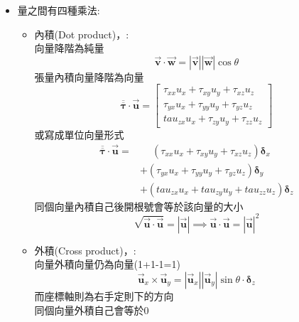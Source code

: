 \documentclass[../main.tex]{subfiles}
\begin{document}
\begin{itemize}
  並定義張量的跡(Trace)為:
  \begin{equation}
    \text{Tr}(\overline{\overline {\bm \tau}}) = \sum_{i} \tau_{ii} = \tau_{xx} + \tau_{yy} + \tau_{zz}
  \end{equation}
  \item 量之間有四種乘法:
  \begin{itemize}
    \item 內積(Dot product)，:\\
    向量降階為純量
    \begin{equation}
      \vec {\bm v} \cdot \vec {\bm w} = |\vec {\bm v}||\vec {\bm w}|\cos\theta
    \end{equation}
    張量內積向量降階為向量
    \begin{equation}
      \overline{\overline {\bm \tau}} \cdot \vec {\bm u} = 
      \begin{bmatrix}
        \tau_{xx}u_x + \tau_{xy}u_y + \tau_{xz}u_z\\
        \tau_{yx}u_x + \tau_{yy}u_y + \tau_{yz}u_z \\
        tau_{zx}u_x + \tau_{zy}u_y + \tau_{zz}u_z
      \end{bmatrix}
    \end{equation}
    或寫成單位向量形式
    \begin{align}
      \overline{\overline {\bm \tau}} \cdot \vec {\bm u} =&\phantom{+} (\tau_{xx}u_x + \tau_{xy}u_y + \tau_{xz}u_z) \bm \delta_x \nonumber \\
      &+ (\tau_{yx}u_x + \tau_{yy}u_y + \tau_{yz}u_z) \bm \delta_y \nonumber \\
      &+ (tau_{zx}u_x + tau_{zy}u_y + tau_{zz}u_z) \bm \delta_z
    \end{align}
    同個向量內積自己後開根號會等於該向量的大小
    \begin{equation}
      \sqrt{\vec {\bm u} \cdot \vec {\bm u}} = |\vec {\bm u}| \implies \boxed{\vec {\bm u} \cdot \vec {\bm u} = |\vec {\bm u}|^2}
    \end{equation}
    \item 外積(Cross product)，:\\
    向量外積向量仍為向量(1+1-1=1)
    \begin{equation}
      \vec {\bm u}_x \times \vec {\bm u}_y = |\vec {\bm u}_x||\vec {\bm u}_y|\sin\theta \cdot \bm \delta_z
    \end{equation}
    而座標軸則為右手定則下的方向\\
    同個向量外積自己會等於0
    \begin{equation}

\end{equation}
\end{itemize}
\end{itemize}
\end{document}
